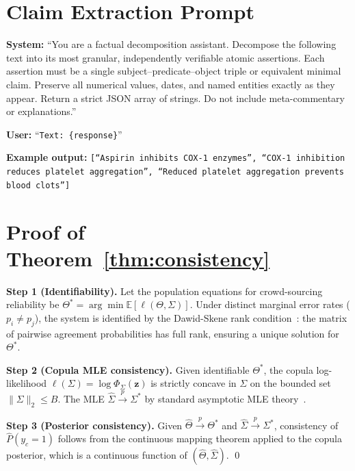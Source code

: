 \documentclass[conference]{IEEEtran}
\begin{document}
\appendix

\section{Claim Extraction Prompt}
\label{app:prompt}

\textbf{System:}
``You are a factual decomposition assistant.
Decompose the following text into its most granular,
independently verifiable atomic assertions.
Each assertion must be a single subject--predicate--object
triple or equivalent minimal claim.
Preserve all numerical values, dates, and named entities
exactly as they appear.
Return a strict JSON array of strings.
Do not include meta-commentary or explanations.''

\textbf{User:}
``\texttt{Text: \{response\}}''

\textbf{Example output:}
\texttt{[``Aspirin inhibits COX-1 enzymes'',
``COX-1 inhibition reduces platelet aggregation'',
``Reduced platelet aggregation prevents blood clots'']}

\section{Proof of Theorem~\ref{thm:consistency}}
\label{app:proofB}

\textbf{Step 1 (Identifiability).}
Let the population equations for crowd-sourcing reliability
be $\Theta^* = \arg\min \mathbb{E}[\ell(\Theta, \Sigma)]$.
Under distinct marginal error rates ($p_i \neq p_j$),
the system is identified by the Dawid-Skene rank
condition~\cite{zhang2014}: the matrix of pairwise
agreement probabilities has full rank, ensuring a unique
solution for $\Theta^*$.

\textbf{Step 2 (Copula MLE consistency).}
Given identifiable $\Theta^*$, the copula log-likelihood
$\ell(\Sigma) = \log \Phi_\Sigma(\mathbf{z})$ is strictly concave
in $\Sigma$ on the bounded set $\|\Sigma\|_2 \leq B$.
The MLE $\hat{\Sigma} \xrightarrow{p} \Sigma^*$ by standard
asymptotic MLE theory~\cite{nelsen2006}.

\textbf{Step 3 (Posterior consistency).}
Given $\hat{\Theta} \xrightarrow{p} \Theta^*$ and
$\hat{\Sigma} \xrightarrow{p} \Sigma^*$,
consistency of $\hat{P}(y_c = 1)$ follows from the
continuous mapping theorem applied to the copula posterior,
which is a continuous function of $(\hat{\Theta}, \hat{\Sigma})$.
\qed
\end{document}
